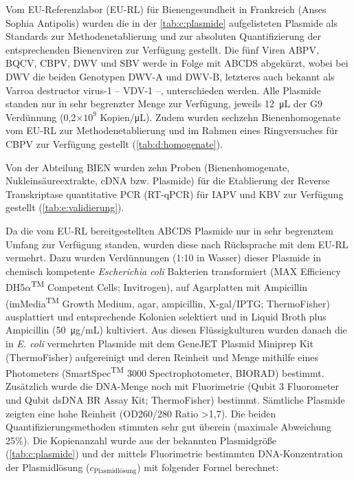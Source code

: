 Vom EU-Referenzlabor (EU-RL) für Bienengesundheit in Frankreich (Anses Sophia Antipolis) wurden die in der \cref{tab:c:plasmide} aufgelisteten Plasmide als Standards zur Methodenetablierung und zur absoluten Quantifizierung der entsprechenden Bienenviren zur Verfügung gestellt. Die fünf Viren ABPV, BQCV, CBPV, DWV und SBV werde in Folge mit ABCDS abgekürzt, wobei bei DWV die beiden Genotypen DWV-A und DWV-B, letzteres auch bekannt als Varroa destructor virus-1 – VDV-1 –, unterschieden werden. Alle Plasmide standen nur in sehr begrenzter Menge zur Verfügung, jeweils \SI{12}{\micro\liter} der G9 Verdünnung (0,2×$10^9$ Kopien/\si{\micro\liter}). Zudem wurden sechzehn Bienenhomogenate vom EU-RL zur Methodenetablierung und im Rahmen eines Ringversuches für CBPV zur Verfügung gestellt (\cref{tab:d:homogenate}).





Von der Abteilung BIEN wurden zehn Proben (Bienenhomogenate, Nukleinsäureextrakte, cDNA bzw. Plasmide) für die Etablierung der Reverse Transkriptase quantitative PCR (RT-qPCR) für IAPV und KBV zur Verfügung gestellt (\cref{tab:e:validierung}).



Da die vom EU-RL bereitgestellten ABCDS Plasmide nur in sehr begrenztem Umfang zur Verfügung standen, wurden diese nach Rücksprache mit dem EU-RL vermehrt. Dazu wurden Verdünnungen (1:10 in Wasser) dieser Plasmide in chemisch kompetente \textit{Escherichia coli} Bakterien transformiert (MAX Efficiency\textsuperscript{\textregistered}
 DH5$\alpha$\textsuperscript{TM} Competent Cells; Invitrogen), auf Agarplatten mit Ampicillin (imMedia\textsuperscript{TM} Growth Medium, agar, ampicillin, X-gal/IPTG; ThermoFisher) ausplattiert und entsprechende Kolonien selektiert und in Liquid Broth plus Ampicillin (\SI{50}{\micro\gram}/\si{\milli\liter}) kultiviert. Aus diesen Flüssigkulturen wurden danach die in \textit{E. coli} vermehrten Plasmide mit dem GeneJET Plasmid Miniprep Kit (ThermoFisher) aufgereinigt und deren Reinheit und Menge mithilfe eines Photometers (SmartSpec\textsuperscript{TM} 3000 Spectrophotometer, BIORAD) bestimmt. Zusätzlich wurde die DNA-Menge noch mit Fluorimetrie (Qubit 3 Fluorometer und Qubit dsDNA BR Assay Kit; ThermoFisher) bestimmt. Sämtliche Plasmide zeigten eine hohe Reinheit (OD260/280 Ratio >1,7). Die beiden Quantifizierungsmethoden stimmten sehr gut überein (maximale Abweichung 25\%). Die Kopienanzahl wurde aus der bekannten Plasmidgröße (\cref{tab:c:plasmide}) und der mittels Fluorimetrie bestimmten DNA-Konzentration der Plasmidlösung ($c_{\text{Plasmidlösung}}$) mit folgender Formel berechnet:

